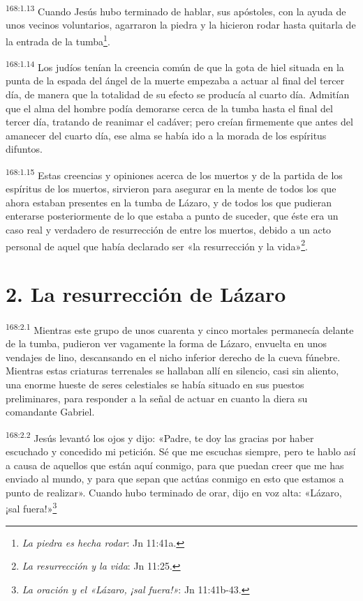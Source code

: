 \par 
\textsuperscript{168:1.13} Cuando Jesús hubo terminado de hablar, sus apóstoles, con la ayuda de unos vecinos voluntarios, agarraron la piedra y la hicieron rodar hasta quitarla de la entrada de la tumba\footnote{\textit{La piedra es hecha rodar}: Jn 11:41a.}.

\par 
\textsuperscript{168:1.14} Los judíos tenían la creencia común de que la gota de hiel situada en la punta de la espada del ángel de la muerte empezaba a actuar al final del tercer día, de manera que la totalidad de su efecto se producía al cuarto día. Admitían que el alma del hombre podía demorarse cerca de la tumba hasta el final del tercer día, tratando de reanimar el cadáver; pero creían firmemente que antes del amanecer del cuarto día, ese alma se había ido a la morada de los espíritus difuntos.

\par 
\textsuperscript{168:1.15} Estas creencias y opiniones acerca de los muertos y de la partida de los espíritus de los muertos, sirvieron para asegurar en la mente de todos los que ahora estaban presentes en la tumba de Lázaro, y de todos los que pudieran enterarse posteriormente de lo que estaba a punto de suceder, que éste era un caso real y verdadero de resurrección de entre los muertos, debido a un acto personal de aquel que había declarado ser «la resurrección y la vida»\footnote{\textit{La resurrección y la vida}: Jn 11:25.}.

\section*{2. La resurrección de Lázaro}
\par 
\textsuperscript{168:2.1} Mientras este grupo de unos cuarenta y cinco mortales permanecía delante de la tumba, pudieron ver vagamente la forma de Lázaro, envuelta en unos vendajes de lino, descansando en el nicho inferior derecho de la cueva fúnebre. Mientras estas criaturas terrenales se hallaban allí en silencio, casi sin aliento, una enorme hueste de seres celestiales se había situado en sus puestos preliminares, para responder a la señal de actuar en cuanto la diera su comandante Gabriel.

\par 
\textsuperscript{168:2.2} Jesús levantó los ojos y dijo: «Padre, te doy las gracias por haber escuchado y concedido mi petición. Sé que me escuchas siempre, pero te hablo así a causa de aquellos que están aquí conmigo, para que puedan creer que me has enviado al mundo, y para que sepan que actúas conmigo en esto que estamos a punto de realizar». Cuando hubo terminado de orar, dijo en voz alta: «Lázaro, ¡sal fuera!»\footnote{\textit{La oración y el «Lázaro, ¡sal fuera!»}: Jn 11:41b-43.}

